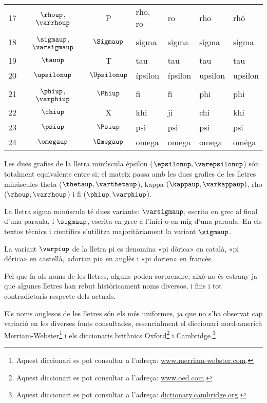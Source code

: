\begin{center}
\begin{tabular}{cccllll}
   17 & $\rhoup$, $\varrhoup$ & P & rho, ro & ro &  rho & rhô\\
   18 & $\sigmaup$, $\varsigmaup$ & $\Sigmaup$ & sigma & sigma &  sigma &sigma\\
   19 & $\tauup$ & T & tau & tau & tau &tau\\
   20 & $\upsilonup$ & $\Upsilonup$ & ípsilon & ípsilon &  upsilon &upsilon\\
   21 & $\phiup$, $\varphiup$ & $\Phiup$ & fi & fi &  phi & phi\\
   22 & $\chiup$ & X & khi & ji &  chi & khi\\
   23 & $\psiup$ & $\Psiup$ & psi & psi &  psi & psi\\
   24 & $\omegaup$ & $\Omegaup$ & omega & omega &  omega & oméga\\
   \bottomrule[1pt]
   \end{tabular}
\end{center}
\pagebreak


Les dues grafies de la lletra minúscula èpsilon  ($\epsilonup,
\varepsilonup$) són totalment equivalents entre si; el mateix passa
amb les dues grafies de les lletres minúscules theta ($\thetaup,
\varthetaup$), kappa $(\kappaup, \varkappaup)$, rho ($\rhoup,\varrhoup$) i fi ($\phiup, \varphiup$).

La lletra sigma minúscula té dues variants: $\varsigmaup$, escrita en
grec al final d'una paraula, i $\sigmaup$, escrita en grec a l'inici o
en mig d'una paraula. En els textos tècnics i científics s'utilitza
majoritàriament la variant $\sigmaup$.

La variant $\varpiup$ de la lletra pi es denomina «pi dòrica» en
català, «pi dórica» en castellà, «dorian pi» en anglès i «pi dorien» en francès.

Pel que fa als noms de les lletres, alguns poden sorprendre; això no
és estrany ja que algunes lletres han rebut històricament noms
diversos, i fins i tot contradictoris respecte dels actuals.

Els noms anglesos de les lletres són els més uniformes, ja que no
s'ha observat cap variació en les diverses fonts consultades, essencialment el diccionari nord-americà Merriam-Webster\footnote{Aquest diccionari es pot consultar a l'adreça: \href{https://www.merriam-webster.com/}{www.merriam-webster.com}.} i els diccionaris britànics Oxford\footnote{Aquest diccionari es pot consultar a l'adreça: \href{http://www.oed.com/}{www.oed.com}.} i Cambridge.\footnote{Aquest diccionari es pot consultar a l'adreça: \href{http://dictionary.cambridge.org/}{dictionary.cambridge.org}.}

